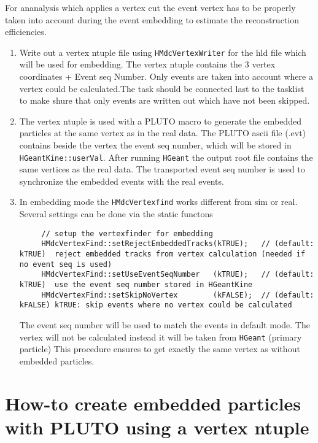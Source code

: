 For ananalysis which applies a vertex cut the event vertex has to be 
properly taken into account during the event embedding to estimate 
the reconstruction efficiencies.
\begin{enumerate}
    \item Write out a vertex ntuple file using \verb+HMdcVertexWriter+ 
    for the hld file which will be used for embedding. The vertex ntuple 
    contains the 3 vertex coordinates + Event seq Number. Only events are 
    taken into account where a vertex could be calculated.The task should 
    be connected last to the tasklist to make shure that only events are 
    written out which have not been skipped.
    \item The vertex ntuple is used with a PLUTO macro to generate the 
    embedded particles at the same vertex as in the real data. The PLUTO 
    ascii file (.evt) contains beside the vertex the event seq number, 
    which will be stored in \verb+HGeantKine::userVal+. After running 
    \verb+HGeant+ the output root file contains the same vertices as the 
    real data. The transported event seq number is used to synchronize 
    the embedded events with the real events.
    \item In embedding mode the \verb+HMdcVertexfind+ works different 
    from sim or real. Several settings can be done via the static functons
     \begin{lstlisting}
     // setup the vertexfinder for embedding
     HMdcVertexFind::setRejectEmbeddedTracks(kTRUE);   // (default: kTRUE)  reject embedded tracks from vertex calculation (needed if no event seq is used)
     HMdcVertexFind::setUseEventSeqNumber   (kTRUE);   // (default: kTRUE)  use the event seq number stored in HGeantKine
     HMdcVertexFind::setSkipNoVertex        (kFALSE);  // (default: kFALSE) kTRUE: skip events where no vertex could be calculated
     \end{lstlisting}
     The event seq number will be used to match the events in default mode. 
     The vertex will not be calculated instead it will be taken from \verb+HGeant+ 
     (primary particle) This procedure ensures to get exactly the same 
     vertex as without embedded particles.
\end{enumerate}

\section{How-to create embedded particles with PLUTO using a vertex ntuple}

